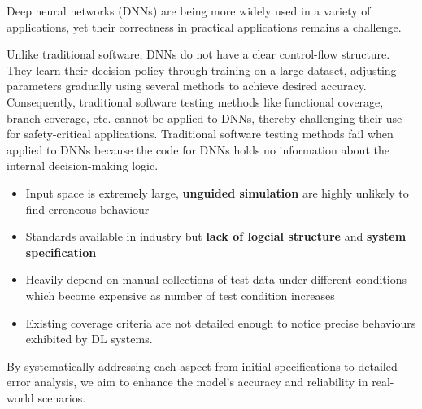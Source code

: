 \documentclass[10pt, conference, a4paper, final]{IEEEtran}
\begin{document}


Deep neural networks (DNNs) are being more widely used in a variety of applications, yet their correctness in practical applications remains a challenge.

Unlike traditional software, DNNs do not have a clear control-flow structure. They learn their decision policy through training on a large dataset, adjusting parameters gradually using several methods to achieve desired accuracy. Consequently, traditional software testing methods like functional coverage, branch coverage, etc. cannot be applied to DNNs, thereby challenging their use for safety-critical applications. Traditional software testing methods fail when applied to DNNs because the code for DNNs holds no information about the internal decision-making logic.
\begin{itemize}
    \item Input space is extremely large, \textbf{unguided simulation} are highly unlikely to find erroneous behaviour
    \item Standards available in industry but \textbf{lack of logcial structure} and \textbf{system specification}  
     \item Heavily depend on manual collections of test data under different conditions which become expensive as number of test condition increases
     \item  Existing coverage criteria are not detailed enough to notice precise behaviours exhibited by DL systems.
\end{itemize}


By systematically addressing each aspect from initial specifications to detailed error analysis, we aim to enhance the model's accuracy and reliability in real-world scenarios.
\end{document}
